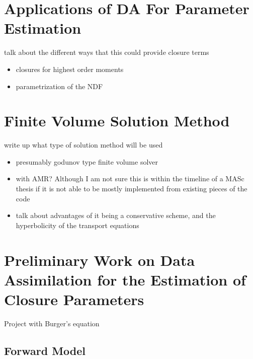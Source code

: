 \documentclass[titlepage,12pt,letterpaper]{article}
\begin{document}
\section{Applications of DA For Parameter Estimation}\label{applications}

talk about the different ways that this could provide closure terms
\begin{itemize}
  \item closures for highest order moments
  \item parametrization of the NDF
\end{itemize}


\section{Finite Volume Solution Method}\label{finite_volume}

write up what type of solution method will be used
\begin{itemize}
  \item presumably godunov type finite volume solver
  \item with AMR? Although I am not sure this is within the timeline of a MASc thesis if it is not able to be mostly implemented from existing pieces of the code
  \item talk about advantages of it being a conservative scheme, and the hyperbolicity of the transport equations
\end{itemize}



\section{Preliminary Work on Data Assimilation for the Estimation of Closure Parameters}\label{DA_project}

Project with Burger's equation


\subsection{Forward Model}\label{DA_project:forward_model}
\end{document}
